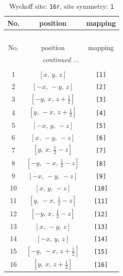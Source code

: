 \documentclass[fleqn,8pt]{jsarticle}
\begin{document}
\begin{longtable}{ccc}
\caption{Wyckoff site: {\tt 16r}, site symmetry: {\tt 1}}
 \\
 \hline \hline
No. & position & mapping \\ \hline \endfirsthead

\multicolumn{2}{l}{\tablename\ \thetable{}} \\
 \hline \hline
No. & position & mapping \\ \hline \endhead

 \hline \hline
\multicolumn{2}{r}{\footnotesize\it continued ...} \\ \endfoot

 \hline \hline
\multicolumn{2}{r}{} \\ \endlastfoot

1 & $\left[ x,\, y,\, z \right]$ & {\tt [1]} \\ \hline
2 & $\left[ - x,\, - y,\, z \right]$ & {\tt [2]} \\ \hline
3 & $\left[ - y,\, x,\, z + \frac{1}{2} \right]$ & {\tt [3]} \\ \hline
4 & $\left[ y,\, - x,\, z + \frac{1}{2} \right]$ & {\tt [4]} \\ \hline
5 & $\left[ - x,\, y,\, - z \right]$ & {\tt [5]} \\ \hline
6 & $\left[ x,\, - y,\, - z \right]$ & {\tt [6]} \\ \hline
7 & $\left[ y,\, x,\, \frac{1}{2} - z \right]$ & {\tt [7]} \\ \hline
8 & $\left[ - y,\, - x,\, \frac{1}{2} - z \right]$ & {\tt [8]} \\ \hline
9 & $\left[ - x,\, - y,\, - z \right]$ & {\tt [9]} \\ \hline
10 & $\left[ x,\, y,\, - z \right]$ & {\tt [10]} \\ \hline
11 & $\left[ y,\, - x,\, \frac{1}{2} - z \right]$ & {\tt [11]} \\ \hline
12 & $\left[ - y,\, x,\, \frac{1}{2} - z \right]$ & {\tt [12]} \\ \hline
13 & $\left[ x,\, - y,\, z \right]$ & {\tt [13]} \\ \hline
14 & $\left[ - x,\, y,\, z \right]$ & {\tt [14]} \\ \hline
15 & $\left[ - y,\, - x,\, z + \frac{1}{2} \right]$ & {\tt [15]} \\ \hline
16 & $\left[ y,\, x,\, z + \frac{1}{2} \right]$ & {\tt [16]} \\
\end{longtable}
\end{document}
